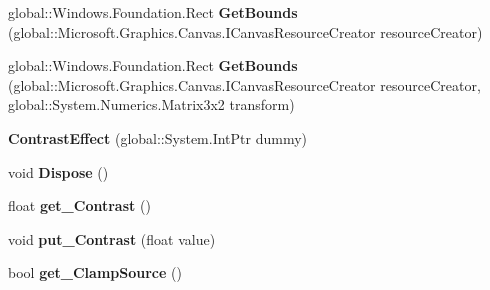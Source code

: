 \begin{DoxyCompactItemize}
\mbox{\label{class_microsoft_1_1_graphics_1_1_canvas_1_1_effects_1_1_contrast_effect_a8d8d0baa90784d8ceef5e69730b00aa4}} 
global\+::\+Windows.\+Foundation.\+Rect {\bfseries Get\+Bounds} (global\+::\+Microsoft.\+Graphics.\+Canvas.\+I\+Canvas\+Resource\+Creator resource\+Creator)
\item 
\mbox{\label{class_microsoft_1_1_graphics_1_1_canvas_1_1_effects_1_1_contrast_effect_a7d7ad97626f28fed20870cf46f5910da}} 
global\+::\+Windows.\+Foundation.\+Rect {\bfseries Get\+Bounds} (global\+::\+Microsoft.\+Graphics.\+Canvas.\+I\+Canvas\+Resource\+Creator resource\+Creator, global\+::\+System.\+Numerics.\+Matrix3x2 transform)
\item 
\mbox{\label{class_microsoft_1_1_graphics_1_1_canvas_1_1_effects_1_1_contrast_effect_a8088c0c5b388e6b2ce8eeb3b08c3c7b0}} 
{\bfseries Contrast\+Effect} (global\+::\+System.\+Int\+Ptr dummy)
\item 
\mbox{\label{class_microsoft_1_1_graphics_1_1_canvas_1_1_effects_1_1_contrast_effect_a6f1bc711c2e2f43a2cdbf5f599a01945}} 
void {\bfseries Dispose} ()
\item 
\mbox{\label{class_microsoft_1_1_graphics_1_1_canvas_1_1_effects_1_1_contrast_effect_a140d08b77f0edc43a81972e67cc7bc4b}} 
float {\bfseries get\+\_\+\+Contrast} ()
\item 
\mbox{\label{class_microsoft_1_1_graphics_1_1_canvas_1_1_effects_1_1_contrast_effect_a23919ae56b418fe712468cc40f3e719a}} 
void {\bfseries put\+\_\+\+Contrast} (float value)
\item 
\mbox{\label{class_microsoft_1_1_graphics_1_1_canvas_1_1_effects_1_1_contrast_effect_adfdc196eeb8d4ab260ff8a02b91a232f}} 
bool {\bfseries get\+\_\+\+Clamp\+Source} ()
\item 

\end{DoxyCompactItemize}
